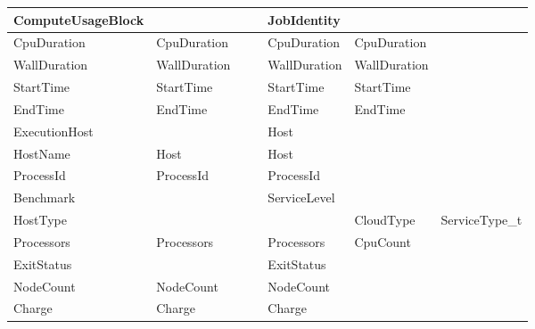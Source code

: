 \begin{longtable}{ | p{} | p{} | p{} | p{} | p{} | p{} | p{} | }



\textbf{Compute\-Usage\-Block}& 		& 			&			& \textbf{JobIdentity}	& 						& \\ \hline
CpuDuration		& CpuDuration		& 			&			& CpuDuration		& CpuDuration					& \\ \hline
WallDuration		& WallDuration		& 			&			& WallDuration		& WallDuration					& \\ \hline
StartTime		& StartTime		& 			&			& StartTime		& StartTime					& \\ \hline
EndTime			& EndTime		& 			&			& EndTime		& EndTime					& \\ \hline
Execution\-Host		& 			&			&			& Host			& 						& \\ \hline
HostName		& Host			&			&			& Host			& 						& \\ \hline
ProcessId		& ProcessId		& 			&			& ProcessId		& 						& \\ \hline
Benchmark               &			&                       &                       & ServiceLevel		&                                               & \\ \hline
HostType		& 			& 			&			& 			& CloudType					& ServiceType\_t\\ \hline
Processors		& Processors		& 			&			& Processors		& CpuCount					& \\ \hline
ExitStatus		& 			& 			&			& ExitStatus		& 						& \\ \hline
NodeCount		& NodeCount		& 			&			& NodeCount		& 						& \\ \hline
Charge			& Charge		& 			&			& Charge		& 						& \\ \hline\hline







\end{longtable}

